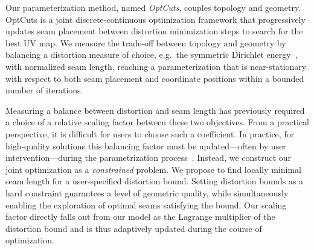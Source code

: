 Our parameterization method, named {\em OptCuts}, couples topology and geometry.
OptCuts is a joint discrete-continuous optimization framework that progressively updates seam placement between distortion minimization steps to search for the best UV map. 
%
We measure the trade-off between topology and geometry by balancing a distortion measure of choice, e.g.\ the symmetric Dirichlet energy~\cite{Smith2015Bijective}, with normalized seam length, reaching a parameterization that is near-stationary with respect to both seam placement and coordinate positions within a bounded number of iterations.

Measuring a balance between distortion and seam length has previously required a choice of a relative scaling factor between these two objectives.  From a practical perspective, it is difficult for users to choose such a coefficient. %
In practice, for high-quality solutions this balancing factor must be %
updated---often by user intervention---during the parametrization process\ \cite{Poranne2017Autocuts}. Instead, we construct our joint optimization as a \emph{constrained} problem. We propose to find locally minimal seam length for a user-specified distortion bound. Setting distortion bounds as a hard constraint guarantees a level of geometric quality, while simultaneously enabling the exploration of optimal seams satisfying the bound. %
Our scaling factor directly falls out from our model as the Lagrange multiplier of the distortion bound and is thus adaptively updated during the course of optimization.  %

